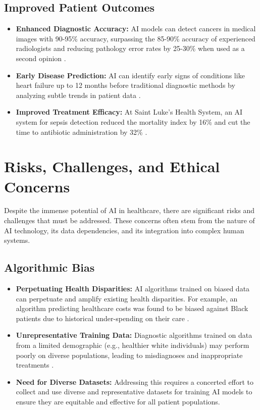 \subsection{Improved Patient Outcomes}
\begin{itemize}
    \item \textbf{Enhanced Diagnostic Accuracy:} AI models can detect cancers in medical images with 90-95\% accuracy, surpassing the 85-90\% accuracy of experienced radiologists and reducing pathology error rates by 25-30\% when used as a second opinion \cite{ThoughtfulAI_AIBenefits}.
    \item \textbf{Early Disease Prediction:} AI can identify early signs of conditions like heart failure up to 12 months before traditional diagnostic methods by analyzing subtle trends in patient data \cite{ThoughtfulAI_AIBenefits}.
    \item \textbf{Improved Treatment Efficacy:} At Saint Luke's Health System, an AI system for sepsis detection reduced the mortality index by 16\% and cut the time to antibiotic administration by 32\% \cite{Forbes_AIBenefits}.
\end{itemize}

\section{Risks, Challenges, and Ethical Concerns}

Despite the immense potential of AI in healthcare, there are significant risks and challenges that must be addressed. These concerns often stem from the nature of AI technology, its data dependencies, and its integration into complex human systems.

\subsection{Algorithmic Bias}
\begin{itemize}
    \item \textbf{Perpetuating Health Disparities:} AI algorithms trained on biased data can perpetuate and amplify existing health disparities. For example, an algorithm predicting healthcare costs was found to be biased against Black patients due to historical under-spending on their care \cite{Paubox_AlgorithmicBias}.
    \item \textbf{Unrepresentative Training Data:} Diagnostic algorithms trained on data from a limited demographic (e.g., healthier white individuals) may perform poorly on diverse populations, leading to misdiagnoses and inappropriate treatments \cite{Inferscience_AlgorithmicBias}.
    \item \textbf{Need for Diverse Datasets:} Addressing this requires a concerted effort to collect and use diverse and representative datasets for training AI models to ensure they are equitable and effective for all patient populations.
\end{itemize}

